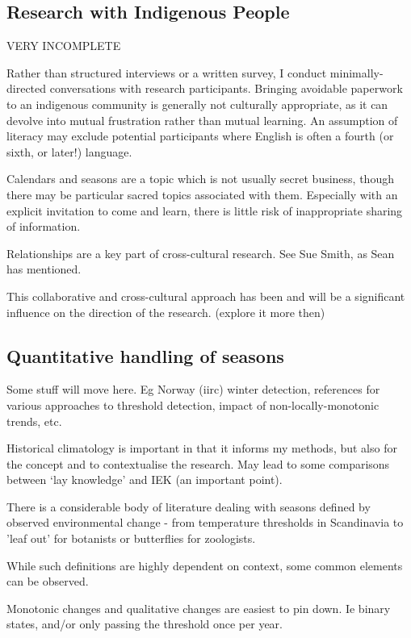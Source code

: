 \subsection{Research with Indigenous People}

VERY INCOMPLETE

Rather than structured interviews or a written survey, I conduct minimally-
directed conversations with research participants.  Bringing avoidable
paperwork to an indigenous community is generally not culturally appropriate,
as it can devolve into mutual frustration rather than mutual learning.  An
assumption of literacy may exclude potential participants where English is
often a fourth (or sixth, or later!) language.

Calendars and seasons are a topic which is not usually secret business, though
there may be particular sacred topics associated with them.  Especially with an
explicit invitation to come and learn, there is little risk of inappropriate
sharing of information.


Relationships are a key part of cross-cultural research.  See Sue Smith, as
Sean has mentioned.

This collaborative and cross-cultural approach has been and will be a
significant influence on the direction of the research. (explore it more then)



\subsection{Quantitative handling of seasons}

Some stuff will move here.  Eg Norway (iirc) winter detection,
references for various approaches to threshold detection,
impact of non-locally-monotonic trends, etc.

Historical climatology is important in that it informs my methods,
but also for the concept and to contextualise the research.  May lead to
some comparisons between `lay knowledge' and IEK (an important point).


There is a considerable body of literature dealing with seasons defined
by observed environmental change - from temperature thresholds in
Scandinavia to 'leaf out' for botanists or butterflies for zoologists.

While such definitions are highly dependent on context, some common
elements can be observed.

Monotonic changes and qualitative changes are easiest to pin down.
Ie binary states, and/or only passing the threshold once per year.

